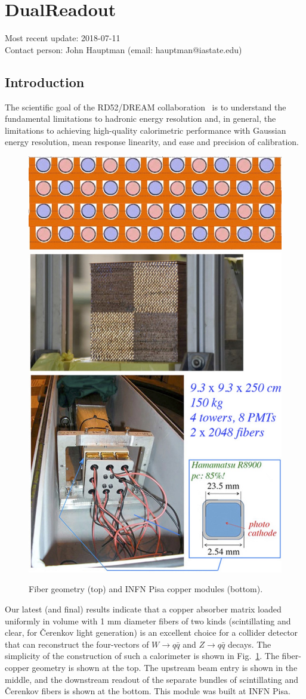 \section{DualReadout}
Most recent update: 2018-07-11 \\
Contact person: John Hauptman (email:  hauptman@iastate.edu)

\subsection{Introduction}
The scientific goal of the RD52/DREAM collaboration~\cite{dreamCollaboration} is to understand the fundamental limitations
to hadronic energy resolution and, in general, the limitations to achieving high-quality calorimetric
performance with Gaussian energy resolution, mean response linearity, and ease and precision of calibration.

\begin{figure}
  \centering
  \includegraphics[width=.5\linewidth]{Calorimeter/DualReadout/f32-fibers.jpg} \\
  \includegraphics[width=.5\linewidth]{Calorimeter/DualReadout/f33-pisa-module.jpg}
  \caption{Fiber geometry (top) and INFN Pisa copper modules (bottom).}
  \label{fig:pisa}
\end{figure}


Our latest (and final) results indicate that a copper absorber matrix loaded uniformly in volume with 1 mm diameter
fibers of two kinds (scintillating and clear, for \v{C}er\-enk\-ov light generation) is an excellent choice for a collider detector that 
can reconstruct the four-vectors of $W \rightarrow q\bar{q}$ and  $Z \rightarrow q\bar{q}$ decays.  The simplicity of the construction of such a calorimeter is shown in Fig.~\ref{fig:pisa}.  The fiber-copper geometry is shown at the top.  The upstream beam entry is shown in the middle, and the downstream readout of the separate bundles of  scintillating and \v{C}er\-enk\-ov fibers is shown at the bottom.  This module was built at INFN Pisa.

